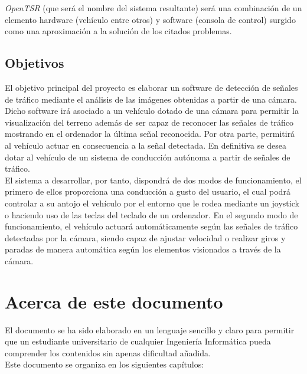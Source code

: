 \documentclass[a4paper,12pt]{article}
\begin{document}

\emph{OpenTSR} (que será el nombre del sistema resultante) será una combinación de un elemento hardware (vehículo entre otros) y software (consola de control) surgido como una aproximación a la solución de los citados problemas.\\


\subsection{Objetivos}

El objetivo principal del proyecto es elaborar un software de detección de señales de tráfico mediante el análisis de las imágenes obtenidas a partir de una cámara. Dicho software irá asociado a un vehículo dotado de una cámara para permitir la visualización del terreno además de ser capaz de reconocer las señales de tráfico mostrando en el ordenador la última señal reconocida. Por otra parte, permitirá al vehículo actuar en consecuencia a la señal detectada. En definitiva se desea dotar al vehículo de un sistema de conducción autónoma a partir de señales de tráfico.\\

El sistema a desarrollar, por tanto, dispondrá de dos modos de funcionamiento, el primero de ellos proporciona una conducción a gusto del usuario, el cual podrá controlar a su antojo el vehículo por el entorno que le rodea mediante un joystick o haciendo uso de las teclas del teclado de un ordenador. En el segundo modo de funcionamiento, el vehículo actuará automáticamente según las señales de tráfico detectadas por la cámara, siendo capaz de ajustar velocidad o realizar giros y paradas de manera automática según los elementos visionados a través de la cámara.

\section{Acerca de este documento}

El documento se ha sido elaborado en un lenguaje sencillo y claro para permitir que un estudiante universitario de cualquier Ingeniería Informática pueda comprender los contenidos sin apenas dificultad añadida.\\

Este documento se organiza en los siguientes capítulos:
\end{document}
